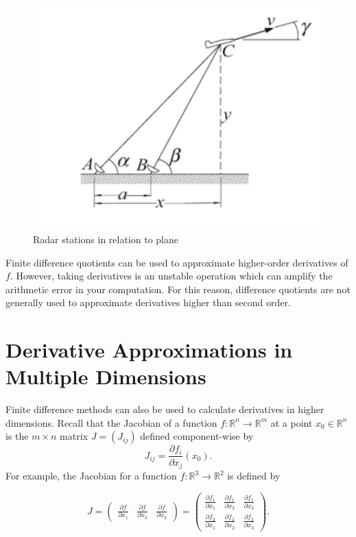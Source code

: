 \begin{figure}
\includegraphics[width=.5\textwidth]{figures/plane_diagram.png}
\caption{Radar stations in relation to plane}
\label{plane}
\end{figure}

\begin{info}
Finite difference quotients can be used to approximate higher-order derivatives of $f$.
However, taking derivatives is an unstable operation which can amplify the arithmetic error in your computation.
For this reason, difference quotients are not generally used to approximate derivatives higher than second order.
\end{info}

\section*{Derivative Approximations in Multiple Dimensions} %

Finite difference methods can also be used to calculate derivatives in higher dimensions.
Recall that the Jacobian of a function $f:\mathbb{R}^n \rightarrow \mathbb{R}^m$ at a point $x_0 \in \mathbb{R}^n$ is the $m \times n$ matrix $J = (J_{ij})$ defined component-wise by
\begin{equation*}
J_{ij} = \frac{\partial f_i}{\partial x_j}(x_0).
\end{equation*}
For example, the Jacobian for a function $f:\mathbb{R}^3 \rightarrow \mathbb{R}^2$ is defined by

\[
J = \begin{pmatrix}
\frac{\partial f}{\partial x_1}&\frac{\partial f}{\partial x_2}&\frac{\partial f}{\partial x_3}
\end{pmatrix}
= \begin{pmatrix}
\frac{\partial f_1}{\partial x_1}&\frac{\partial f_1}{\partial x_2}&\frac{\partial f_1}{\partial x_3}\\
\frac{\partial f_2}{\partial x_1}&\frac{\partial f_2}{\partial x_2}&\frac{\partial f_2}{\partial x_3}
\end{pmatrix}.
\]

